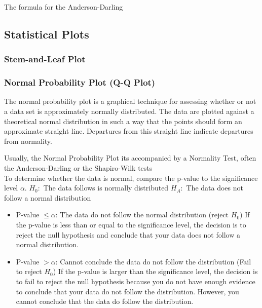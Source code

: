 \documentclass[11pt]{article}
\providecommand{\tightlist}{%
      \setlength{\itemsep}{0pt}\setlength{\parskip}{0pt}}
\begin{document}
 

The formula for the Anderson-Darling

\hypertarget{statistical-plots}{%
\subsection{Statistical Plots}\label{statistical-plots}}

\hypertarget{stem-and-leaf-plot}{%
\subsubsection{Stem-and-Leaf Plot}\label{stem-and-leaf-plot}}

\hypertarget{normal-probability-plot-q-q-plot}{%
\subsubsection{Normal Probability Plot (Q-Q
Plot)}\label{normal-probability-plot-q-q-plot}}

The normal probability plot is a graphical technique for assessing
whether or not a data set is approximately normally distributed. The
data are plotted against a theoretical normal distribution in such a way
that the points should form an approximate straight line. Departures
from this straight line indicate departures from normality.

Usually, the Normal Probability Plot its accompanied by a Normality
Test, often the Anderson-Darling or the Shapiro-Wilk tests\\
To determine whether the data is normal, compare the p-value to the
significance level \(\alpha\). \(H_0:\) The data follows is normally
distributed \(H_A:\) The data does not follow a normal distribution

\begin{itemize}
\tightlist
\item
  P-value \(\leq \alpha\): The data do not follow the normal
  distribution (reject \(H_0\)) If the p-value is less than or equal to
  the significance level, the decision is to reject the null hypothesis
  and conclude that your data does not follow a normal distribution.
\item
  P-value \(> \alpha\): Cannot conclude the data do not follow the
  distribution (Fail to reject \(H_0\)) If the p-value is larger than
  the significance level, the decision is to fail to reject the null
  hypothesis because you do not have enough evidence to conclude that
  your data do not follow the distribution. However, you cannot conclude
  that the data do follow the distribution.
\end{itemize}
\end{document}
